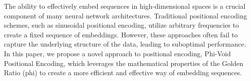 The ability to effectively embed sequences in high-dimensional spaces is a crucial component of many neural network architectures. Traditional positional encoding schemes, such as sinusoidal positional encoding, utilize arbitrary frequencies to create a fixed sequence of embeddings. However, these approaches often fail to capture the underlying structure of the data, leading to suboptimal performance. In this paper, we propose a novel approach to positional encoding, Phi-Void Positional Encoding, which leverages the mathematical properties of the Golden Ratio (phi) to create a more efficient and effective way of embedding sequences.